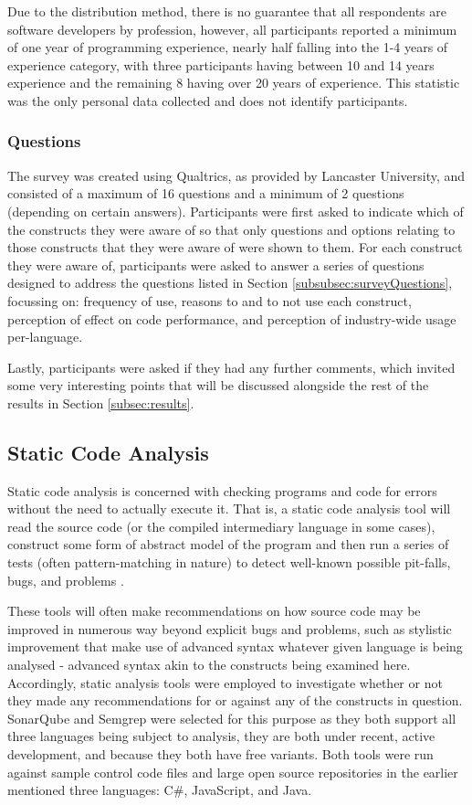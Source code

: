 \documentclass{article}
\begin{document}
            Due to the distribution method, there is no guarantee that all respondents are software developers by profession, however, all participants reported a minimum of one year of programming experience, nearly half falling into the 1-4 years of experience category, with three participants having between 10 and 14 years experience and the remaining 8 having over 20 years of experience. This statistic was the only personal data collected and does not identify participants.
        \subsubsection{Questions}
            The survey was created using Qualtrics, as provided by Lancaster University, and consisted of a maximum of 16 questions and a minimum of 2 questions (depending on certain answers).
            Participants were first asked to indicate which of the constructs they were aware of so that only questions and options relating to those constructs that they were aware of were shown to them. For each construct they were aware of, participants were asked to answer a series of questions designed to address the questions listed in Section \ref{subsubsec:surveyQuestions}, focussing on: frequency of use, reasons to and to not use each construct, perception of effect on code performance, and perception of industry-wide usage per-language.
            
            Lastly, participants were asked if they had any further comments, which invited some very interesting points that will be discussed alongside the rest of the results in Section \ref{subsec:results}.
    \subsection{Static Code Analysis}
        Static code analysis is concerned with checking programs and code for errors without the need to actually execute it. That is, a static code analysis tool will read the source code (or the compiled intermediary language in some cases), construct some form of abstract model of the program and then run a series of tests (often pattern-matching in nature) to detect well-known possible pit-falls, bugs, and problems \cite{staticCodeAnalysis}.

        These tools will often make recommendations on how source code may be improved in numerous way beyond explicit bugs and problems, such as stylistic improvement that make use of advanced syntax whatever given language is being analysed - advanced syntax akin to the constructs being examined here. Accordingly, static analysis tools were employed to investigate whether or not they made any recommendations for or against any of the constructs in question. SonarQube and Semgrep were selected for this purpose as they both support all three languages being subject to analysis, they are both under recent, active development, and because they both have free variants. Both tools were run against sample control code files and large open source repositories in the earlier mentioned three languages: C\#, JavaScript, and Java.
            
\end{document}

